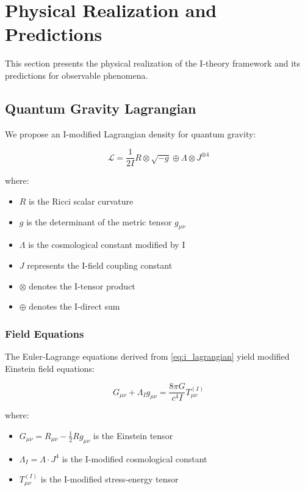 \section{Physical Realization and Predictions}
\label{sec:physical_realization}

This section presents the physical realization of the I-theory framework and its predictions for observable phenomena.

\subsection{Quantum Gravity Lagrangian}
\label{subsec:quantum_gravity_lagrangian}

We propose an I-modified Lagrangian density for quantum gravity:

\begin{equation}
\label{eq:i_lagrangian}
\mathcal{L} = \frac{1}{2I} R \otimes \sqrt{-g} \oplus \Lambda \otimes J^{\otimes 4}
\end{equation}

where:
\begin{itemize}
    \item $R$ is the Ricci scalar curvature
    \item $g$ is the determinant of the metric tensor $g_{\mu\nu}$
    \item $\Lambda$ is the cosmological constant modified by I
    \item $J$ represents the I-field coupling constant
    \item $\otimes$ denotes the I-tensor product
    \item $\oplus$ denotes the I-direct sum
\end{itemize}

\subsubsection{Field Equations}

The Euler-Lagrange equations derived from \eqref{eq:i_lagrangian} yield modified Einstein field equations:

\begin{equation}
\label{eq:i_field_equations}
G_{\mu\nu} + \Lambda_I g_{\mu\nu} = \frac{8\pi G}{c^4 I} T_{\mu\nu}^{(I)}
\end{equation}

where:
\begin{itemize}
    \item $G_{\mu\nu} = R_{\mu\nu} - \frac{1}{2}Rg_{\mu\nu}$ is the Einstein tensor
    \item $\Lambda_I = \Lambda \cdot J^4$ is the I-modified cosmological constant
    \item $T_{\mu\nu}^{(I)}$ is the I-modified stress-energy tensor
\end{itemize}

